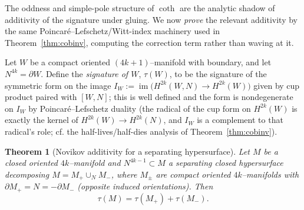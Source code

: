 \documentclass[12pt]{article}
\newtheorem{theorem}{Theorem}
\theoremstyle{definition}
\begin{document}
The oddness and simple-pole structure of $\coth$ are the analytic shadow of additivity of
the signature under gluing. We now \emph{prove} the relevant additivity by the same
Poincar\'e--Lefschetz/Witt-index machinery used in Theorem~\ref{thm:cobinv}, computing the
correction term rather than waving at it.

Let $W$ be a compact oriented $(4k{+}1)$--manifold with boundary, and let $N^{4k}=\partial W$.
Define the \emph{signature of $W$}, $\tau(W)$, to be the signature of the symmetric form
on the image $I_W:=\operatorname{im}\big(H^{2k}(W,N)\to H^{2k}(W)\big)$ given by cup product
paired with $[W,N]$; this is well defined and the form is nondegenerate on $I_W$ by
Poincar\'e--Lefschetz duality (the radical of the cup form on $H^{2k}(W)$ is exactly the
kernel of $H^{2k}(W)\to H^{2k}(N)$, and $I_W$ is a complement to that radical's role; cf.
the half-lives/half-dies analysis of Theorem~\ref{thm:cobinv}).

\begin{theorem}[Novikov additivity for a separating hypersurface]\label{thm:novikov}
Let $M$ be a closed oriented $4k$--manifold and $N^{4k-1}\subset M$ a separating closed
hypersurface decomposing $M=M_+\cup_N M_-$, where $M_\pm$ are compact oriented
$4k$--manifolds with $\partial M_+=N=-\partial M_-$ (opposite induced orientations). Then
\[
\tau(M)=\tau(M_+)+\tau(M_-).
\tag{13}\label{eq:novikov}
\]
\end{theorem}
\end{document}
